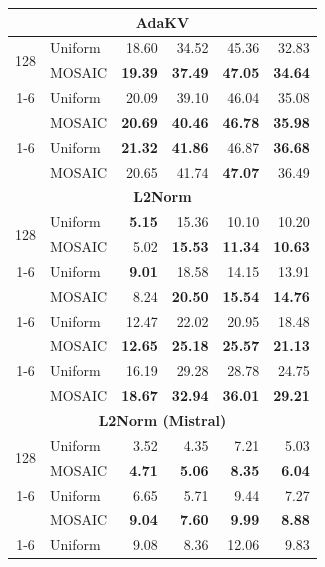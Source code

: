 \begin{table}[tp]
\begin{tabular}{@{} c l rrrr @{}}
    \multicolumn{6}{c}{\textbf{AdaKV}} \\
    \midrule
    \multirow{2}{*}{128} & Uniform & 18.60 & 34.52 & 45.36 & 32.83 \\
     & MOSAIC & \textbf{19.39} & \textbf{37.49} & \textbf{47.05} & \textbf{34.64} \\
    \cmidrule(l){1-6}
    \multirow{2}{*}{256} & Uniform & 20.09 & 39.10 & 46.04 & 35.08 \\
     & MOSAIC & \textbf{20.69} & \textbf{40.46} & \textbf{46.78} & \textbf{35.98} \\
    \cmidrule(l){1-6}
    \multirow{2}{*}{512} & Uniform & \textbf{21.32} & \textbf{41.86} & 46.87 & \textbf{36.68} \\
     & MOSAIC & 20.65 & 41.74 & \textbf{47.07} & 36.49 \\
    \midrule
    \multicolumn{6}{c}{\textbf{L2Norm}} \\
    \midrule
    \multirow{2}{*}{128} & Uniform & \textbf{5.15} & 15.36 & 10.10 & 10.20 \\
     & MOSAIC & 5.02 & \textbf{15.53} & \textbf{11.34} & \textbf{10.63} \\
    \cmidrule(l){1-6}
    \multirow{2}{*}{256} & Uniform & \textbf{9.01} & 18.58 & 14.15 & 13.91 \\
     & MOSAIC & 8.24 & \textbf{20.50} & \textbf{15.54} & \textbf{14.76} \\
    \cmidrule(l){1-6}
    \multirow{2}{*}{512} & Uniform & 12.47 & 22.02 & 20.95 & 18.48 \\
     & MOSAIC & \textbf{12.65} & \textbf{25.18} & \textbf{25.57} & \textbf{21.13} \\
    \cmidrule(l){1-6}
    \multirow{2}{*}{1024} & Uniform & 16.19 & 29.28 & 28.78 & 24.75 \\
     & MOSAIC & \textbf{18.67} & \textbf{32.94} & \textbf{36.01} & \textbf{29.21} \\
    \midrule
    \multicolumn{6}{c}{\textbf{L2Norm (Mistral)}} \\
    \midrule
    \multirow{2}{*}{128} & Uniform & 3.52 & 4.35 & 7.21 & 5.03 \\
     & MOSAIC & \textbf{4.71} & \textbf{5.06} & \textbf{8.35} & \textbf{6.04} \\
    \cmidrule(l){1-6}
    \multirow{2}{*}{256} & Uniform & 6.65 & 5.71 & 9.44 & 7.27 \\
     & MOSAIC & \textbf{9.04} & \textbf{7.60} & \textbf{9.99} & \textbf{8.88} \\
    \cmidrule(l){1-6}
    \multirow{2}{*}{512} & Uniform & 9.08 & 8.36 & 12.06 & 9.83 \\

\end{tabular}
\end{table}
